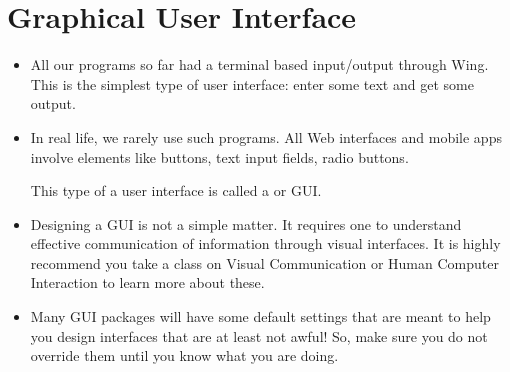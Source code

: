 \documentclass[letterpaper,10pt,english]{sphinxmanual}
\begin{document}
\section{Graphical User Interface}
\label{\detokenize{lecture_notes/lec22_tkinter:graphical-user-interface}}\begin{itemize}
\item {} 
All our programs so far had a terminal based input/output through
Wing. This is the simplest type of user interface: enter some text
and get some output.

\item {} 
In real life, we rarely use such programs. All Web interfaces and
mobile apps involve elements like buttons, text input fields, radio
buttons.

This type of a user interface is called a  
or GUI.

\item {} 
Designing a GUI is not a simple matter. It requires one to
understand effective communication of information through visual
interfaces. It is highly recommend you take a class on Visual
Communication or Human Computer Interaction to learn more about
these.

\item {} 
Many GUI packages will have some default settings that are meant to
help you design interfaces that are at least not awful! So, make sure
you do not override them until you know what you are doing.

\end{itemize}
\end{document}
